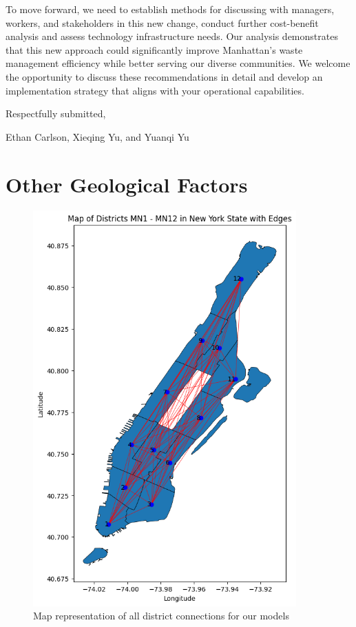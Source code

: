 \documentclass{article}
\begin{document}
To move forward, we need to establish methods for discussing with managers, workers, and stakeholders in this new change, conduct further cost-benefit analysis and assess technology infrastructure needs. Our analysis demonstrates that this new approach could significantly improve Manhattan's waste management efficiency while better serving our diverse communities. We welcome the opportunity to discuss these recommendations in detail and develop an implementation strategy that aligns with your operational capabilities.

Respectfully submitted,

Ethan Carlson, Xieqing Yu, and Yuanqi Yu


\section{Other Geological Factors}

\begin{figure}[H]
	\centering
	\includegraphics[width=0.9\textwidth]{figures/linemap.png}
	\caption{Map representation of all district connections for our models}
	\label{fig:10all}
\end{figure}
\end{document}
